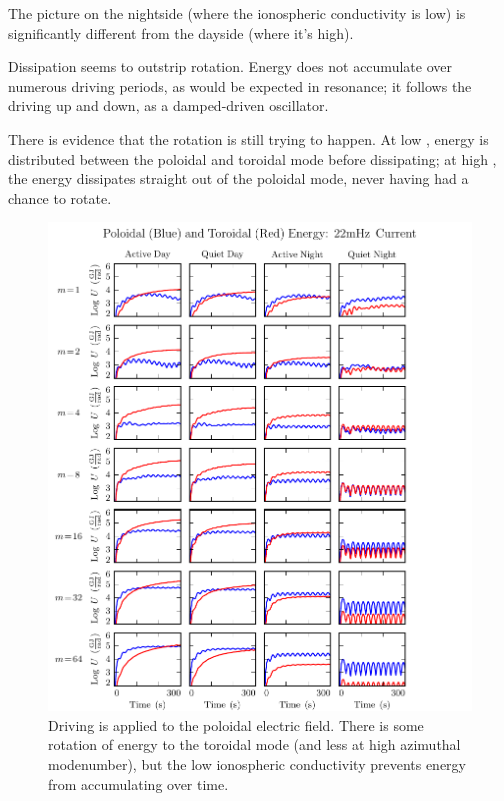 
The picture on the nightside (where the ionospheric conductivity is low) is significantly different from the dayside (where it's high). 

Dissipation seems to outstrip rotation. Energy does not accumulate over numerous driving periods, as would be expected in resonance; it follows the driving up and down, as a damped-driven oscillator. 

There is evidence that the rotation is still trying to happen. At low \azm, energy is distributed between the poloidal and toroidal mode before dissipating; at high \azm, the energy dissipates straight out of the poloidal mode, never having had a chance to rotate. 

\begin{figure}[H]
    \centering
    \includegraphics[width=\textwidth]{figures/U_PT_022mHz.pdf}
    \caption[Poloidal and Toroidal Energy: Quiet Night]{
      Driving is applied to the poloidal electric field. There is some rotation of energy to the toroidal mode (and less at high azimuthal modenumber), but the low ionospheric conductivity prevents energy from accumulating over time. 
    }
    \label{fig_U_PT_night}
\end{figure}

